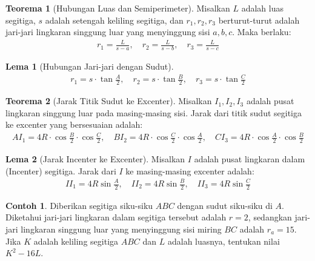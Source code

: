 \documentclass[aspectratio=169]{beamer}
\theoremstyle{definition}
\newtheorem{teorema}{Teorema}
\newtheorem{lema}{Lema}
\newtheorem{contoh}{Contoh}
\begin{document}
\begin{frame}{\insertsection}{\insertsubsection}
  \begin{teorema}[Hubungan Luas dan Semiperimeter]
    Misalkan $L$ adalah luas segitiga, $s$ adalah setengah keliling segitiga, dan $r_1, r_2, r_3$ berturut-turut adalah jari-jari lingkaran singgung luar yang menyinggung sisi $a, b, c$. Maka berlaku:
    \begin{align*}
      r_1  = \frac{L}{s - a}, \quad
      r_2  = \frac{L}{s - b}, \quad
      r_3  = \frac{L}{s - c}
    \end{align*}
  \end{teorema}

  \begin{lema}[Hubungan Jari-jari dengan Sudut]
    \begin{align*}
      r_1  = s \cdot \tan\frac{A}{2}, \quad
      r_2  = s \cdot \tan\frac{B}{2}, \quad
      r_3  = s \cdot \tan\frac{C}{2}
    \end{align*}
  \end{lema}
\end{frame}

\begin{frame}{\insertsection}{\insertsubsection}
  \begin{teorema}[Jarak Titik Sudut ke Excenter]
    Misalkan $I_1, I_2, I_3$ adalah pusat lingkaran singgung luar pada masing-masing sisi. Jarak dari titik sudut segitiga ke excenter yang bersesuaian adalah:
    \begin{align*}
      AI_1  = 4R \cdot \cos\frac{B}{2} \cdot \cos\frac{C}{2}, \quad
      BI_2  = 4R \cdot \cos\frac{C}{2} \cdot \cos\frac{A}{2}, \quad
      CI_3  = 4R \cdot \cos\frac{A}{2} \cdot \cos\frac{B}{2}
    \end{align*}
  \end{teorema}

  \begin{lema}[Jarak Incenter ke Excenter]
    Misalkan $I$ adalah pusat lingkaran dalam (Incenter) segitiga. Jarak dari $I$ ke masing-masing excenter adalah:
    \begin{align*}
      II_1  = 4R \sin\frac{A}{2}, \quad
      II_2  = 4R \sin\frac{B}{2}, \quad
      II_3  = 4R \sin\frac{C}{2}
    \end{align*}
  \end{lema}
\end{frame}

\begin{frame}{\insertsection}{\insertsubsection}
  \begin{contoh}
    Diberikan segitiga siku-siku $ABC$ dengan sudut siku-siku di $A$. Diketahui jari-jari lingkaran dalam segitiga tersebut adalah $r = 2$, sedangkan jari-jari lingkaran singgung luar yang menyinggung sisi miring $BC$ adalah $r_a = 15$. Jika $K$ adalah keliling segitiga $ABC$ dan $L$ adalah luasnya, tentukan nilai $K^2 - 16L$.
  \end{contoh}
\end{frame}
\end{document}
